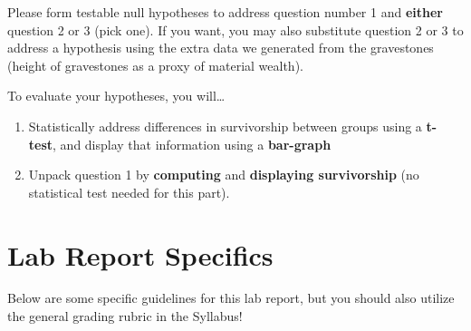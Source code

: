 \documentclass[]{book}
\providecommand{\tightlist}{%
  \setlength{\itemsep}{0pt}\setlength{\parskip}{0pt}}
\begin{document}
Please form testable null hypotheses to address question number 1 and \textbf{either} question 2 or 3 (pick one). If you want, you may also substitute question 2 or 3 to address a hypothesis using the extra data we generated from the gravestones (height of gravestones as a proxy of material wealth).

To evaluate your hypotheses, you will\ldots{}

\begin{enumerate}
\def\labelenumi{\arabic{enumi}.}
\tightlist
\item
  Statistically address differences in survivorship between groups using a \textbf{t-test}, and display that information using a \textbf{bar-graph}
\item
  Unpack question 1 by \textbf{computing} and \textbf{displaying survivorship} (no statistical test needed for this part).
\end{enumerate}

\pagebreak

\hypertarget{lab-report-specifics}{%
\section{Lab Report Specifics}\label{lab-report-specifics}}

Below are some specific guidelines for this lab report, but you should also utilize the general grading rubric in the Syllabus!
\end{document}
